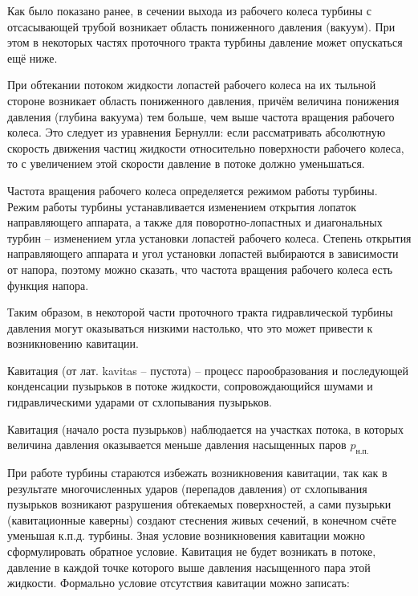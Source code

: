 Как было показано ранее, в сечении выхода из рабочего колеса турбины с отсасывающей трубой возникает область пониженного давления (вакуум). При этом в некоторых частях проточного тракта турбины давление может опускаться ещё ниже.

При обтекании потоком жидкости лопастей рабочего колеса на их тыльной стороне возникает область пониженного давления, причём величина понижения давления (глубина вакуума) тем больше, чем выше частота вращения рабочего колеса. Это следует из уравнения Бернулли: если рассматривать абсолютную скорость движения частиц жидкости относительно поверхности рабочего колеса, то с увеличением этой скорости давление в потоке должно уменьшаться.

Частота вращения рабочего колеса определяется режимом работы турбины. Режим работы турбины устанавливается изменением открытия лопаток направляющего аппарата, а также для поворотно-лопастных и диагональных турбин -- изменением угла установки лопастей рабочего колеса. Степень открытия направляющего аппарата и угол установки лопастей выбираются в зависимости от напора, поэтому можно сказать, что частота вращения рабочего колеса есть функция напора.

Таким образом, в некоторой части проточного тракта гидравлической турбины давления могут оказываться низкими настолько, что это может привести к возникновению кавитации.

\begin{opred}
   Кавитация (от лат. kavitas -- пустота) -- процесс парообразования и последующей конденсации пузырьков в потоке жидкости, сопровождающийся шумами и гидравлическими ударами от схлопывания пузырьков.
\end{opred}

 Кавитация (начало роста пузырьков) наблюдается на участках потока, в которых величина давления оказывается меньше давления насыщенных паров $p_{\text{н.п.}}$

При работе турбины стараются избежать возникновения кавитации, так как в результате многочисленных ударов (перепадов давления) от схлопывания пузырьков возникают разрушения обтекаемых поверхностей, а сами пузырьки (кавитационные каверны) создают стеснения живых сечений, в конечном счёте уменьшая к.п.д. турбины. Зная условие возникновения кавитации можно сформулировать обратное условие. Кавитация не будет возникать в потоке, давление в каждой точке которого выше давления насыщенного пара этой жидкости. Формально условие отсутствия кавитации можно записать:

